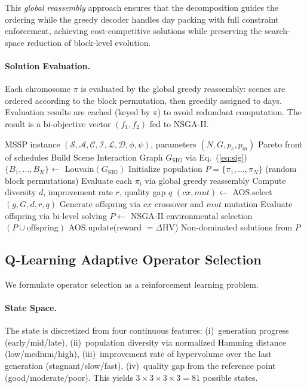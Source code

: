 This \emph{global reassembly} approach ensures that the decomposition guides the ordering while the greedy decoder handles day packing with full constraint enforcement, achieving cost-competitive solutions while preserving the search-space reduction of block-level evolution.

\paragraph{Solution Evaluation.}
Each chromosome $\pi$ is evaluated by the global greedy reassembly: scenes are ordered according to the block permutation, then greedily assigned to days.
Evaluation results are cached (keyed by $\pi$) to avoid redundant computation.
The result is a bi-objective vector $(f_1, f_2)$ fed to NSGA-II.

\begin{algorithm}[t]
\caption{BDM-AOS: Bi-Level Decomposition Matheuristic}
\label{alg:bdm_aos}
\begin{algorithmic}[1]
\REQUIRE MSSP instance $(\mathcal{S}, \mathcal{A}, \mathcal{C}, \mathcal{I}, \mathcal{L}, \mathcal{D}, \phi, \psi)$, parameters $(N, G, p_c, p_m)$
\ENSURE Pareto front of schedules
\STATE Build Scene Interaction Graph $G_{\text{SIG}}$ via Eq.~(\ref{eq:sig})
\STATE $\{B_1, \ldots, B_K\} \leftarrow$ Louvain$(G_{\text{SIG}})$
\STATE Initialize population $P = \{\pi_1, \ldots, \pi_N\}$ (random block permutations)
\STATE Evaluate each $\pi_i$ via global greedy reassembly
    \STATE Compute diversity $d$, improvement rate $r$, quality gap $q$
    \STATE $(cx, mut) \leftarrow$ AOS.select$(g, G, d, r, q)$ 
    \STATE Generate offspring via $cx$ crossover and $mut$ mutation
    \STATE Evaluate offspring via bi-level solving
    \STATE $P \leftarrow$ NSGA-II environmental selection$(P \cup \text{offspring})$
    \STATE AOS.update(reward $= \Delta$HV)
\ENDFOR
\RETURN Non-dominated solutions from $P$
\end{algorithmic}
\end{algorithm}

\subsection{Q-Learning Adaptive Operator Selection}
\label{sec:aos}

We formulate operator selection as a reinforcement learning problem.

\paragraph{State Space.}
The state is discretized from four continuous features:
(i)~generation progress (early/mid/late),
(ii)~population diversity via normalized Hamming distance (low/medium/high),
(iii)~improvement rate of hypervolume over the last generation (stagnant/slow/fast),
(iv)~quality gap from the reference point (good/moderate/poor).
This yields $3 \times 3 \times 3 \times 3 = 81$ possible states.

